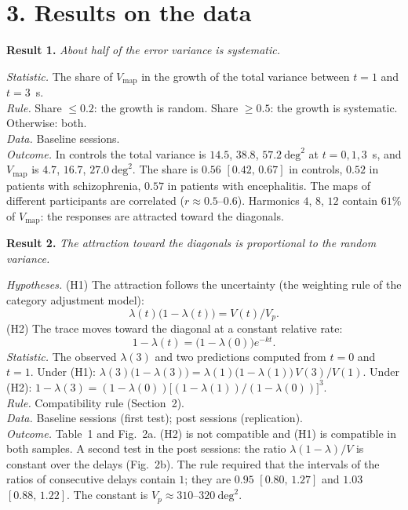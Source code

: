 \documentclass[10pt,a4paper]{article}
\newcommand{\ci}[2]{$[#1,\,#2]$}
\newcommand{\dsq}{\mathrm{deg}^2}
\newcommand{\res}[1]{\textbf{Result #1.}}
\newcommand{\hyp}{\emph{Hypotheses.} }
\newcommand{\stat}{\emph{Statistic.} }
\newcommand{\rul}{\emph{Rule.} }
\newcommand{\dat}{\emph{Data.} }
\newcommand{\outc}{\emph{Outcome.} }
\begin{document}
\section*{3. Results on the data}

\res{1} \emph{About half of the error variance is systematic.}

\stat The share of $V_{\mathrm{map}}$ in the growth of the total variance between $t=1$ and $t=3$~s.\\
\rul Share $\le0.2$: the growth is random. Share $\ge0.5$: the growth is systematic. Otherwise: both.\\
\dat Baseline sessions.\\
\outc In controls the total variance is $14.5$, $38.8$, $57.2~\dsq$ at $t=0,1,3$~s, and $V_{\mathrm{map}}$ is
$4.7$, $16.7$, $27.0~\dsq$. The share is $0.56$ \ci{0.42}{0.67} in controls, $0.52$ in patients with
schizophrenia, $0.57$ in patients with encephalitis. The maps of different participants are correlated
($r\approx0.5$--$0.6$). Harmonics $4$, $8$, $12$ contain $61\%$ of $V_{\mathrm{map}}$: the responses are
attracted toward the diagonals.

\res{2} \emph{The attraction toward the diagonals is proportional to the random variance.}

\hyp (H1) The attraction follows the uncertainty (the weighting rule of the category adjustment model):
\begin{equation}
\lambda(t)\bigl(1-\lambda(t)\bigr)=V(t)/V_p .
\label{law}
\end{equation}
(H2) The trace moves toward the diagonal at a constant relative rate:
\begin{equation}
1-\lambda(t)=\bigl(1-\lambda(0)\bigr)e^{-kt}.
\label{rate}
\end{equation}
\stat The observed $\lambda(3)$ and two predictions computed from $t=0$ and $t=1$. Under (H1):
$\lambda(3)\bigl(1-\lambda(3)\bigr)=\lambda(1)\bigl(1-\lambda(1)\bigr)\,V(3)/V(1)$. Under (H2):
$1-\lambda(3)=(1-\lambda(0))\bigl[(1-\lambda(1))/(1-\lambda(0))\bigr]^3$.\\
\rul Compatibility rule (Section~2).\\
\dat Baseline sessions (first test); post sessions (replication).\\
\outc Table~1 and Fig.~2a. (H2) is not compatible and (H1) is compatible in both samples. A second test in the
post sessions: the ratio $\lambda(1-\lambda)/V$ is constant over the delays (Fig.~2b). The rule required
that the intervals of the ratios of consecutive delays contain $1$; they are $0.95$ \ci{0.80}{1.27} and
$1.03$ \ci{0.88}{1.22}. The constant is $V_p\approx310$--$320~\dsq$.
\end{document}
